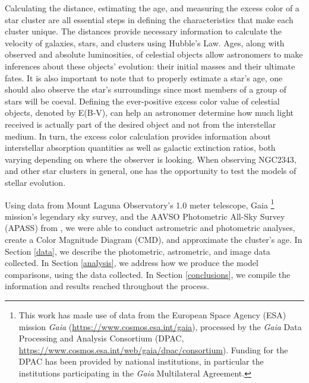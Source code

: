 \documentclass[linenumbers]{aastex631}
\begin{document}
Calculating the distance, estimating the age, and measuring the excess color of a star cluster are all essential steps in defining the characteristics that make each cluster unique. The distances provide necessary information to calculate the velocity of galaxies, stars, and clusters using Hubble's Law. Ages, along with observed and absolute luminosities, of celestial objects allow astronomers to make inferences about these objects' evolution: their initial masses and their ultimate fates. It is also important to note that to properly estimate a star's age, one should also observe the star's surroundings since most members of a group of stars will be coeval. Defining the ever-positive excess color value of celestial objects, denoted by E(B-V), can help an astronomer determine how much light received is actually part of the desired object and not from the interstellar medium. In turn, the excess color calculation provides information about interstellar absorption quantities as well as galactic extinction ratios, both varying depending on where the observer is looking. When observing NGC2343, and other star clusters in general, one has the opportunity to test the models of stellar evolution.

Using data from Mount Laguna Observatory's 1.0 meter telescope, Gaia
\footnote{This work has made use of data from the European Space Agency (ESA) mission {\it Gaia} (\url{https://www.cosmos.esa.int/gaia}), processed by the {\it Gaia} Data Processing and Analysis Consortium (DPAC, \url{https://www.cosmos.esa.int/web/gaia/dpac/consortium}). Funding for the DPAC has been provided by national institutions, in particular the institutions participating in the {\it Gaia} Multilateral Agreement.} 
mission's legendary sky survey, and the AAVSO Photometric All-Sky Survey (APASS) from \citep{2016yCat}, we were able to conduct astrometric and photometric analyses, create a Color Magnitude Diagram (CMD), and approximate the cluster's age. In Section \ref{data}, we describe the photometric, astrometric, and image data collected. In Section \ref{analysis}, we address how we produce the model comparisons, using the data collected. In Section \ref{conclusions}, we compile the information and results reached throughout the process. 
\end{document}
